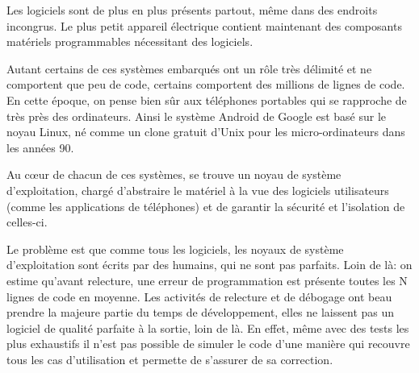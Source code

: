 Les logiciels sont de plus en plus présents partout, même dans des endroits
incongrus. Le plus petit appareil électrique contient maintenant des composants
matériels programmables nécessitant des logiciels.

Autant certains de ces systèmes embarqués ont un rôle très délimité et ne
comportent que peu de code, certains comportent des millions de lignes de code.
En cette époque, on pense bien sûr aux téléphones portables qui se rapproche
de très près des ordinateurs. Ainsi le système Android de Google est basé sur le
noyau Linux, né comme un clone gratuit d'Unix pour les micro-ordinateurs dans
les années 90.

Au cœur de chacun de ces systèmes, se trouve un noyau de système d'exploitation,
chargé d'abstraire le matériel à la vue des logiciels utilisateurs (comme les
applications de téléphones) et de garantir la sécurité et l'isolation de
celles-ci.

Le problème est que comme tous les logiciels, les noyaux de système
d'exploitation sont écrits par des humains, qui ne sont pas parfaits. Loin de
là: on estime qu'avant relecture, une erreur de programmation est présente
toutes les N lignes de code en moyenne. Les activités de relecture et de
débogage ont beau prendre la majeure partie du temps de développement, elles ne
laissent pas un logiciel de qualité parfaite à la sortie, loin de là. En effet,
même avec des tests les plus exhaustifs il n'est pas possible de simuler le code
d'une manière qui recouvre tous les cas d'utilisation et permette de s'assurer
de sa correction.



